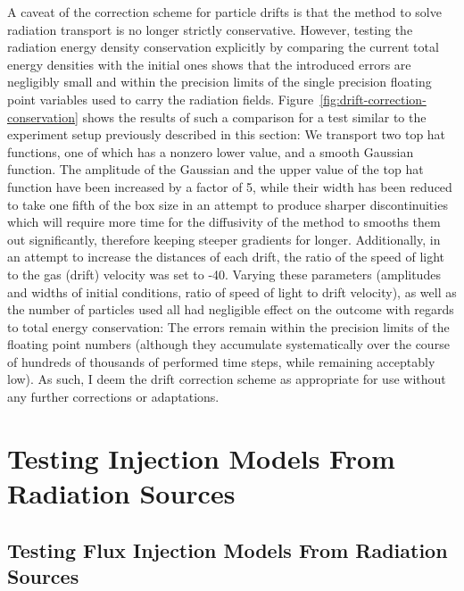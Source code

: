 A caveat of the correction scheme for particle drifts is that the method to solve radiation
transport is no longer strictly conservative. However, testing the radiation energy density
conservation explicitly by comparing the current total energy densities with the initial ones shows
that the introduced errors are negligibly small and within the precision limits of the single
precision floating point variables used to carry the radiation fields.
Figure~\ref{fig:drift-correction-conservation} shows the results of such a comparison for a test
similar to the experiment setup previously described in this section: We transport two top hat
functions, one of which has a nonzero lower value, and a smooth Gaussian function. The amplitude of
the Gaussian and the upper value of the top hat function have been increased by a factor of 5,
while
their width has been reduced to take one fifth of the box size in an attempt to produce sharper
discontinuities which will require more time for the diffusivity of the method to smooths them out
significantly, therefore keeping steeper gradients for longer. Additionally, in an attempt to
increase the distances of each drift, the ratio of the speed of light to the gas (drift) velocity
was set to -40. Varying these parameters (amplitudes and widths of initial conditions,
ratio of speed of light to drift velocity), as well as the number of particles used all had
negligible effect on the outcome with regards to total energy conservation: The errors remain
within the precision limits of the floating point numbers (although they accumulate systematically
over the course of hundreds of thousands of performed time steps, while remaining acceptably low).
As such, I deem the drift correction scheme as appropriate for use without any further corrections
or adaptations.







\section{Testing Injection Models From Radiation Sources}


\subsection{Testing Flux Injection Models From Radiation Sources}\label{chap:results-injection}

